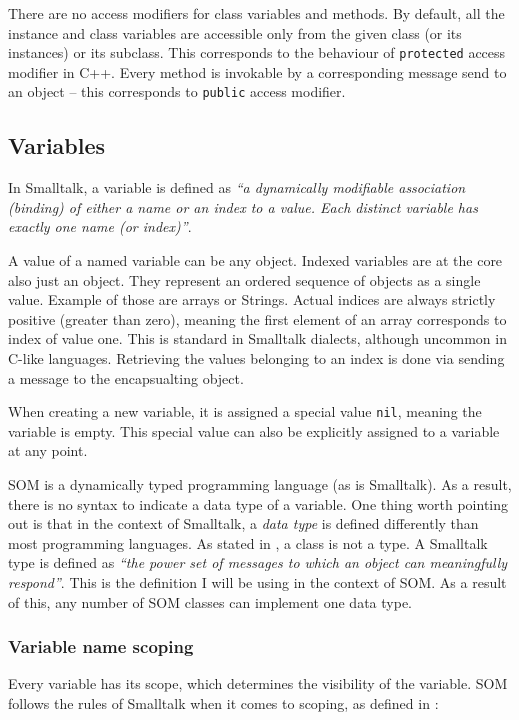 \documentclass[thesis=M,english]{FITthesis}[2019/12/23]
\begin{document}
There are no access modifiers for class variables and methods. By default, all the instance and class variables are accessible only
from the given class (or its instances) or its subclass. This corresponds to the behaviour of \texttt{protected} access modifier in
C++. Every method is invokable by a corresponding message send to an object -- this corresponds to \texttt{public} access modifier.

\subsection{Variables}
In Smalltalk, a variable is defined as \textit{``a dynamically modifiable association (binding) of either a name
or an index to a value. Each distinct variable has exactly one name (or index)''}\cite{smalltalk-essentials}.

A value of a named variable can be any object. Indexed variables are at the core also just an object. They
represent an ordered sequence of objects as a single value. Example of those are arrays or Strings. Actual
indices are always strictly positive (greater than zero), meaning the first element of an array corresponds
to index of value one. This is standard in Smalltalk dialects, although uncommon in C-like languages. Retrieving
the values belonging to an index is done via sending a message to the encapsualting object.

When creating a new variable, it is assigned a special value \texttt{nil}, meaning the variable is empty. This
special value can also be explicitly assigned to a variable at any point.

SOM is a dynamically typed programming language (as is Smalltalk). As a result, there is no syntax to indicate
a data type of a variable. One thing worth pointing out is that in the context of Smalltalk, a \textit{data type}
is defined differently than most programming languages. As stated in \cite{smalltalk-essentials}, a class is not
a type. A Smalltalk type is defined as \textit{``the power set of messages to which an object can meaningfully
respond''}\cite{smalltalk-essentials}. This is the definition I will be using in the context of SOM. As a result
of this, any number of SOM classes can implement one data type.

\subsubsection{Variable name scoping}
Every variable has its scope, which determines the visibility of the variable. SOM follows the rules of Smalltalk
when it comes to scoping, as defined in \cite{smalltalk-essentials}:
\end{document}
